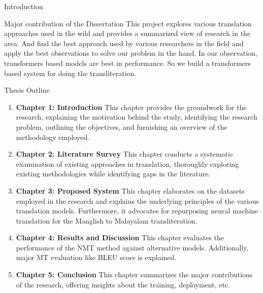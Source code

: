 \begin{chapter}{Introduction}
    \begin{section}{Major contribution of the Dissertation}
        This project explores various translation approaches used in the wild and provides a summarized view of research in the area. And find the best approach used by various researchers in the field and apply the best observations to solve our problem in the hand. In our observation, transformers based models are best in performance. So we build a transformers based system for doing the transliteration.
    \end{section}
    \begin{section}{Thesis Outline}
    \begin{enumerate} 
    \item \textbf{Chapter 1: Introduction} This chapter provides the groundwork for the research, explaining the motivation behind the study, identifying the research problem, outlining the objectives, and furnishing an overview of the methodology employed. \item \textbf{Chapter 2: Literature Survey} This chapter conducts a systematic examination of existing approaches in translation, thoroughly exploring existing methodologies while identifying gaps in the literature. 
    \item \textbf{Chapter 3: Proposed System} This chapter elaborates on the datasets employed in the research and explains the underlying principles of the various translation models. Furthermore, it advocates for repurposing neural machine translation for the Manglish to Malayalam transliteration. 
    \item \textbf{Chapter 4: Results and Discussion} This chapter evaluates the performance of the NMT method against alternative models. Additionally, major MT evaluation like BLEU score is explained. 
    \item \textbf{Chapter 5: Conclusion} This chapter summarizes the major contributions of the research, offering insights about the training, deployment, etc.
\end{enumerate}
    \end{section}
\end{chapter}